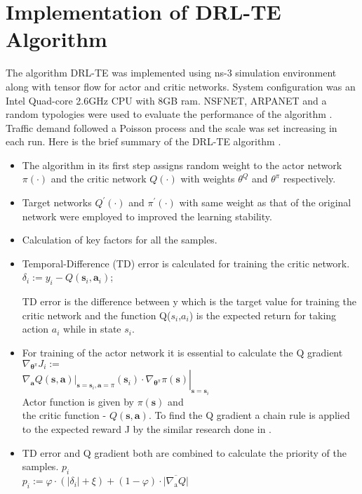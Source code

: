 \section{Implementation of DRL-TE Algorithm}
\label{sec:concl}

The algorithm DRL-TE was implemented using ns-3 simulation environment along with tensor flow for actor and critic networks.
System configuration \cite{Exp:_DRLapproach} was an Intel Quad-core 2.6GHz CPU with 8GB ram. NSFNET, ARPANET and a random typologies were used to evaluate the performance of the algorithm \cite{Exp:_DRLapproach}. Traffic demand followed a Poisson process and the scale was set increasing in each run. Here is the brief summary of the DRL-TE algorithm \cite{Exp:_DRLapproach}.
\begin{itemize}
\item The algorithm in its first step assigns random weight to the actor network $\pi(\cdot)$ and the critic network $Q(\cdot)$ with weights $\theta^{Q}$ and $\theta^{\pi}$ respectively. 
\item Target networks $Q^{\prime}(\cdot)$ and 
$\pi^{\prime}(\cdot)$ with same weight as that of the original network were employed to improved the learning stability.
\item Calculation of key factors for all the samples.
\item  Temporal-Difference (TD) error is calculated for training the  critic network. \\
$\delta_{i}:=y_{i}-Q\left(\mathbf{s}_{i}, \mathbf{a}_{i}\right)$;

TD error is the difference between y which is the target value for training the critic network and the function Q(${s}_{i}$,${a}_{i}$) is the expected return for taking action ${a}_{i}$ while in state ${s}_{i}$.

\item For training of the actor network it is essential to calculate the Q gradient $\nabla_{\boldsymbol{\theta}^{\pi}} J_{i}:=$ \\
$\left.\left.\nabla_{\mathbf{a}} Q(\mathbf{s}, \mathbf{a})\right|_{\mathbf{s}=\mathbf{s}_{i}, \mathbf{a}=\pi}\left(\mathbf{s}_{i}\right) \cdot \nabla_{\boldsymbol{\theta}^{\pi}} \pi(\mathbf{s})\right|_{\mathbf{s}=\mathbf{s}_{i}}$ \\

Actor function is given by $\pi(\mathbf{s})$ and \\
the critic function - $Q(\mathbf{s}, \mathbf{a})$.
To find the Q gradient a chain rule is applied to the expected reward J by the similar research done in    \cite{low_Lapsley:_handb_Flowcontrol}.  
\item TD error and Q gradient both are combined to calculate the priority of the samples. $p_{i}$ \\
$p_{i}:=\varphi \cdot\left(\left|\delta_{i}\right|+\xi\right)+(1-\varphi) \cdot \overline{\left|\nabla_{\mathrm{a}} Q\right|}$ \\


\end{itemize}
